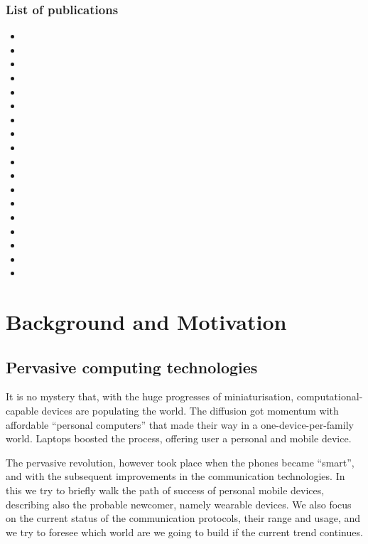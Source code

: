 \documentclass[12pt,a4paper,twoside,openright]{book}
\begin{document}
\section{List of publications}
\nobibliography*
\begin{itemize}
 \item {}
 \item {}
 \item {}
 \item {}
 \item {}
 \item {}
 \item {}
 \item {}
 \item {}
 \item {}
 \item {}
 \item {}
 \item {}
 \item {}
 \item {}
 \item {}
 \item {}
 \item {}
\end{itemize}

\part{Background and Motivation}
\label{background}
\chapter{Pervasive computing technologies}
\label{pervasive-devices}

It is no mystery that, with the huge progresses of miniaturisation, computational-capable devices are populating the world.
%
The diffusion got momentum with affordable ``personal computers'' that made their way in a one-device-per-family world.
%
Laptops boosted the process, offering user a personal and mobile device.

The pervasive revolution, however took place when the phones became ``smart'', and with the subsequent improvements in the communication technologies.
%
In this\levelText{} we try to briefly walk the path of success of personal mobile devices, describing also the probable newcomer, namely wearable devices.
%
We also focus on the current status of the communication protocols, their range and usage, and we try to foresee which world are we going to build if the current trend continues.
\end{document}
